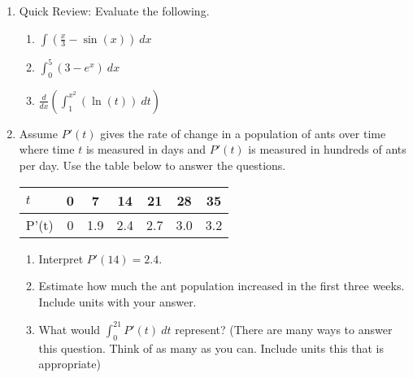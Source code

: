 \documentclass[11pt,fleqn]{article}
\begin{document}
\vspace*{-0.7in}

\begin{center}
  \Large{}
  \end{center}
\begin{enumerate}
\item Quick Review: Evaluate the following.
\begin{multicols}{3}
\begin{enumerate}
\item $\displaystyle{\int \left(\frac{x}{3}-\sin(x) \right) \: dx}$
\item $\displaystyle{\int_0^5 \left(3-e^x \right) \: dx}$
\item $\displaystyle{\frac{d}{dx} \left(\int_1^{x^2} \left(\ln(t)\right) \: dt\right)}$
\end{enumerate}
\end{multicols}

\vfill

\item Assume $P'(t)$ gives the rate of change in a population of ants over time where time $t$ is measured in days and $P'(t)$ is measured in hundreds of ants per day. Use the table below to answer the questions.\\

\begin{tabular}{l|c|c|c|c|c|c}
$t$&0&7&14&21&28&35\\
\hline
P'(t)&0&1.9&2.4&2.7&3.0&3.2\\
\end{tabular}
\begin{enumerate}
\item Interpret $P'(14)=2.4.$\\

\item Estimate how much the ant population increased in the first three weeks. Include units with your answer.\\
\vfill

\item What would $\displaystyle{\int_0^{21} P'(t)\: dt}$ represent? (There are many ways to answer this question. Think of as many as you can. Include units this that is appropriate)
\vfill


\end{enumerate}
\end{enumerate}
\end{document}
